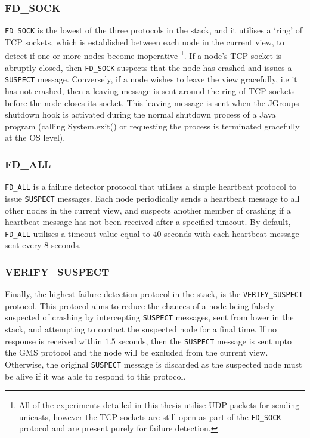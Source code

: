     \subsubsection*{FD\_SOCK}     
    \texttt{FD\_SOCK} is the lowest of the three protocols in the stack, and it utilises a \textquoteleft{}ring' of TCP sockets, which is established between each node in the current view, to detect if one or more nodes become inoperative \footnote{All of the experiments detailed in this thesis utilise UDP packets for sending unicasts, however the TCP sockets are still open as part of the \texttt{FD\_SOCK} protocol and are present purely for failure detection.}.  If a node's TCP socket is abruptly closed, then \texttt{FD\_SOCK} suspects that the node has crashed and issues a \texttt{SUSPECT} message.  Conversely, if a node wishes to leave the view gracefully, i.e it has not crashed, then a leaving message is sent around the ring of TCP sockets before the node closes its socket.  This leaving message is sent when the JGroups shutdown hook is activated during the normal shutdown process of a Java program (calling System.exit() or requesting the process is terminated gracefully at the OS level).  
    
    \subsubsection*{FD\_ALL} 
    \texttt{FD\_ALL} is a failure detector protocol that utilises a simple heartbeat protocol \citep{AW98} to issue \texttt{SUSPECT} messages.  Each node periodically sends a heartbeat message to all other nodes in the current view, and suspects another member of crashing if a heartbeat message has not been received after a specified timeout.  By default, \texttt{FD\_ALL} utilises a timeout value equal to $40$ seconds with each heartbeat message sent every $8$ seconds.  
    
     \subsubsection*{VERIFY\_SUSPECT} 
    Finally, the highest failure detection protocol in the stack, is the \texttt{VERIFY\_SUSPECT} protocol.  This protocol aims to reduce the chances of a node being falsely suspected of crashing by intercepting \texttt{SUSPECT} messages, sent from lower in the stack, and attempting to contact the suspected node for a final time.  If no response is received within $1.5$ seconds, then the \texttt{SUSPECT} message is sent upto the GMS protocol and the node will be excluded from the current view.  Otherwise, the original \texttt{SUSPECT} message is discarded as the suspected node must be alive if it was able to respond to this protocol.  
    
